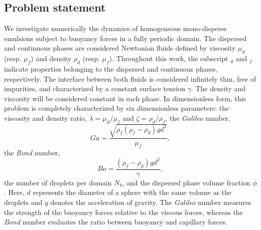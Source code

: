 \subsection{Problem statement}

We investigate numerically the dynamics of homogeneous mono-disperse emulsions subject to buoyancy forces in a fully periodic domain. 
The dispersed and continuous phases are considered Newtonian fluids defined by viscosity $\mu_d$ (resp. $\mu_f$) and density $\rho_d$ (resp. $\mu_f$).
Throughout this work, the subscript $_d$ and $_f$ indicate properties belonging to the dispersed and continuous phases, respectively. 
The interface between both fluids is considered infinitely thin, free of impurities, and characterized by a constant surface tension $\gamma$. %
The density and viscosity will be considered constant in each phase.
In dimensionless form, this problem is completely characterized by six dimensionless parameters:  the viscosity and density ratio, $\lambda = \mu_d / \mu_f$ and $\zeta = \rho_d / \rho_f$,  
the \textit{Galileo} number, 
\begin{equation*}
    Ga =\frac{\sqrt{\rho_f(\rho_f - \rho_d) g d^3}}{\mu_f},
\end{equation*}
the \textit{Bond} number, 
\begin{equation*}
    Bo =\frac{(\rho_f - \rho_d) g d^2}{\gamma},
\end{equation*}
the number of droplets per domain $N_b$, and the dispersed phase volume fraction $\phi$. 
Here, $d$ represents the diameter of a sphere with the same volume as the droplets and $g$ denotes the acceleration of gravity.
The \textit{Galileo} number measures the strength of the buoyancy forces relative to the viscous forces, whereas the \textit{Bond} number evaluates the ratio between buoyancy and capillary forces. 

